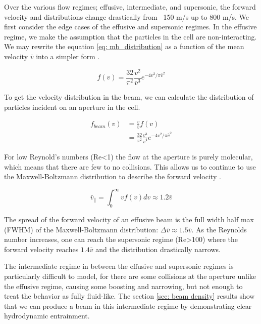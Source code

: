 Over the various flow regimes; effusive, intermediate, and supersonic, the forward velocity and distributions change drastically from ~150 m/s up to 800 m/s. We first consider the edge cases of the effusive and supersonic regimes. In the effusive regime, we make the assumption that the particles in the cell are non-interacting. We may rewrite the equation \ref{eq: mb_distribution} as a function of the mean velocity $\bar{v}$ into a simpler form .

\begin{equation}
	f(v) = \frac{32}{\pi^2} \frac{v^2}{\bar{v}^3} e^{-4v^2/\pi \bar{v}^2} \label{eq: mb_simplified}
\end{equation}

To get the velocity distribution in the beam, we can calculate the distribution of particles incident on an aperture in the cell.

\begin{align*}
	f_{beam}(v) & = \frac{v}{\bar{v}}f(v)  \\
	& = \frac{32}{\pi^2} \frac{v^3}{\bar{v}^4} e^{-4v^2/\pi \bar{v}^2}
\end{align*}

For low Reynold's numbers (Re<1) the flow at the aperture is purely molecular, which means that there are few to no collisions. This allows us to continue to use the Maxwell-Boltzmann distribution to describe the forward velocity \cite{Hutzler2011c}.

\begin{equation}
	\bar{v}_\parallel = \int_0^\infty v f(v) dv \approx 1.2 \bar{v}
\end{equation}

The spread of the forward velocity of an effusive beam is the full width half max (FWHM) of the Maxwell-Boltzmann distribution: $\Delta\bar{v} \approx 1.5 \bar{v}$. As the Reynolds number increases, one can reach the supersonic regime (Re>100) where the forward velocity reaches $1.4\bar{v}$ and the distribution drastically narrows.\cite{Hutzler2011c,Pauly}

The intermediate regime in between the effusive and supersonic regimes is particularly difficult to model, for there are some collisions at the aperture unlike the effusive regime, causing some boosting and narrowing, but not enough to treat the behavior as fully fluid-like. The section \ref{sec: beam density} results show that we can produce a beam in this intermediate regime by demonstrating clear hydrodynamic entrainment.

